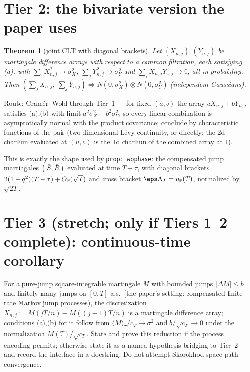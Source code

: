 \documentclass[11pt]{article}
\theoremstyle{plain}
\newtheorem{theorem}{Theorem}
\theoremstyle{remark}
\newcommand{\To}{\Rightarrow}
\begin{document}
\section*{Tier 2: the bivariate version the paper uses}

\begin{theorem}[joint CLT with diagonal brackets]\label{thm:joint}
Let $(X_{n,j}),(Y_{n,j})$ be martingale difference arrays with respect to a
common filtration, each satisfying (a), with
$\sum_jX_{n,j}^2\to\sigma_X^2$, $\sum_jY_{n,j}^2\to\sigma_Y^2$ and
$\sum_jX_{n,j}Y_{n,j}\to0$, all in probability. Then
$(\sum_jX_{n,j},\ \sum_jY_{n,j})\To N(0,\sigma_X^2)\otimes N(0,\sigma_Y^2)$
(independent Gaussians).
\end{theorem}

\noindent Route: Cram\'er--Wold through Tier~1 --- for fixed $(a,b)$ the array
$aX_{n,j}+bY_{n,j}$ satisfies (a),(b) with limit
$a^2\sigma_X^2+b^2\sigma_Y^2$, so every linear combination is asymptotically
normal with the product covariance; conclude by characteristic functions of the
pair (two-dimensional L\'evy continuity, or directly: the 2d charFun evaluated
at $(u,v)$ is the 1d charFun of the combined array at $1$).

This is exactly the shape used by \texttt{prop:twophase}: the compensated jump
martingales $(\bar S,\bar R)$ evaluated at time $T-\tau$, with diagonal brackets
$2(1+q^2)(T-\tau)+O_{\mathbb{P}}(\sqrt T)$ and cross bracket $\eps\Lambda_T=o_\PP(T)$,
normalized by $\sqrt{2T}$.

\section*{Tier 3 (stretch; only if Tiers 1--2 complete): continuous-time corollary}

For a pure-jump square-integrable martingale $M$ with bounded jumps
$|\Delta M|\le b$ and finitely many jumps on $[0,T]$ a.s.\ (the paper's setting:
compensated finite-rate Markov jump processes), the discretization
$X_{n,j}:=M(jT/n)-M((j-1)T/n)$ is a martingale difference array; conditions
(a),(b) for it follow from $\langle M\rangle_T/c_T\to\sigma^2$ and
$b/\sqrt{c_T}\to0$ under the normalization $M(T)/\sqrt{c_T}$. State and prove
this reduction if the process encoding permits; otherwise state it as a named
hypothesis bridging to Tier~2 and record the interface in a docstring. Do not
attempt Skorokhod-space path convergence.
\end{document}
